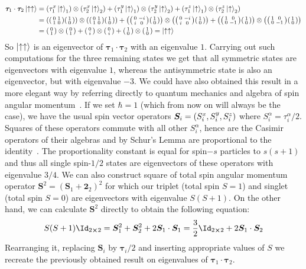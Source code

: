 \begin{align*}
    \bm{\tau}_1 \cdot \bm{\tau}_2 \ket{\ua\ua} &= 
    \left(\tau_1^x \ket{\ua}_1\right) \otimes \left(\tau^x_2 \ket{\ua}_2\right) + 
    \left(\tau_1^y \ket{\ua}_1\right) \otimes \left(\tau^y_2 \ket{\ua}_2\right) +
    \left(\tau_1^z \ket{\ua}_1\right) \otimes \left(\tau^z_2 \ket{\ua}_2\right)\nonumber\\
    &= \left( \smqty(\pmat{1}) \smqty(1\\0)\right) \otimes \left( \smqty(\pmat{1}) \smqty(1\\0)\right) +
    \left( \smqty(\pmat{2}) \smqty(1\\0)\right) \otimes \left( \smqty(\pmat{2}) \smqty(1\\0)\right)+
    \left( \smqty(\pmat{3}) \smqty(1\\0)\right) \otimes \left( \smqty(\pmat{3}) \smqty(1\\0)\right)\\
    &= \smqty(0\\1) \otimes \smqty(0\\1) + \smqty(0\\i) \otimes \smqty(0\\i) + 
    \smqty(1\\0) \otimes \smqty(1\\0) = \ket{\ua\ua}
\end{align*}
So \(\ket{\uparrow\uparrow}\) is an eigenvector of \(\bm{\tau}_1 \cdot \bm{\tau}_2\) with
an eigenvalue \(1\). Carrying out such computations for the three remaining states we get
that all symmetric states are eigenvectors with eigenvalue \(1\), whereas the
antisymmetric state is also an eigenvector, but with eigenvalue \(-3\). 
We could have also obtained this result in a more elegant way by referring directly
to quantum mechanics and algebra of spin angular momentum~\autocite{Sakurai2017}.
If we set \(\hbar = 1\) (which from now on will always be the case), we have the usual
spin vector operators \(\bm{S}_i = \left(S^{x}_i,S^{y}_i, S^{z}_i\right) \) where
 \(S_i^{\alpha} = \tau_i^{\alpha}/2\).
Squares of these operators commute with all other \(S_i^{\alpha}\), hence are the
Casimir operators of their algebras and by Schur's Lemma are proportional to
the identity~\autocite{Woit2017}.
The proportionality constant is equal for spin\(-s\) particles to \(s(s+1)\) and thus
all single spin-\(1/2\) states are eigenvectors of these operators with eigenvalue \(3/4\). 
We can also construct square of total spin angular momentum operator
\(\bm{S}^2 = (\bm{S}_1 + \bm{2}_2)^2\) for which our triplet (total spin \(S=1\)) and singlet
(total spin \(S=0\)) are eigenvectors with eigenvalue \(S(S+1)\). On the other hand, we 
can calculate \(\bm{S}^2\) directly to obtain the following equation:
\begin{equation}
    S(S+1)\Id_{2\cross 2} = \bm{S}_1^2 + \bm{S}_2^2 + 2\bm{S}_1\cdot \bm{S}_1 = \frac{3}{2}\Id_{2\cross 2} + 2\bm{S}_1\cdot\bm{S}_2
\end{equation} 
Rearranging it, replacing \(\bm{S}_i\) by \(\bm{\tau}_i/2\) and inserting appropriate values
of \(S\) we recreate the previously obtained result on eigenvalues of 
\(\bm{\tau}_1\cdot\bm{\tau}_2\).

